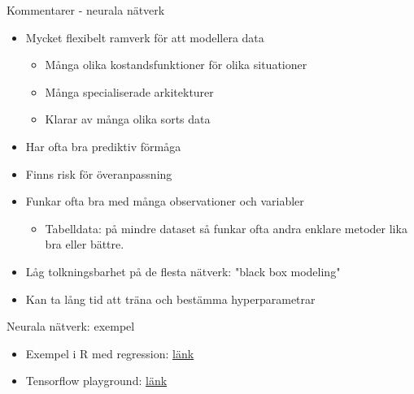 \documentclass[10pt,english]{beamer}
\begin{document}
\begin{frame}{Kommentarer - neurala nätverk }
    \begin{itemize}
        \item Mycket flexibelt ramverk för att modellera data
          \begin{itemize}
            \item Många olika kostandsfunktioner för olika situationer
            \item Många specialiserade arkitekturer
            \item Klarar av många olika sorts data
          \end{itemize}
        \item Har ofta bra prediktiv förmåga
        \item Finns risk för överanpassning
        \item Funkar ofta bra med många observationer och variabler
        \begin{itemize}
                  \item Tabelldata: på mindre dataset så funkar ofta andra enklare metoder lika bra eller bättre.
        \end{itemize}
        \item Låg tolkningsbarhet på de flesta nätverk: "black box modeling"
        \item Kan ta lång tid att träna och bestämma hyperparametrar
    \end{itemize}
\end{frame}

\begin{frame}{Neurala nätverk: exempel }
  \begin{itemize}
    \item Exempel i R med regression: \href{https://raw.githubusercontent.com/STIMALiU/732G57_ML/master/lectures/lecture7/keras_reg_lecture.R}{länk}
    \item Tensorflow playground: \href{https://playground.tensorflow.org/}{länk}
  \end{itemize}
\end{frame}
\end{document}
